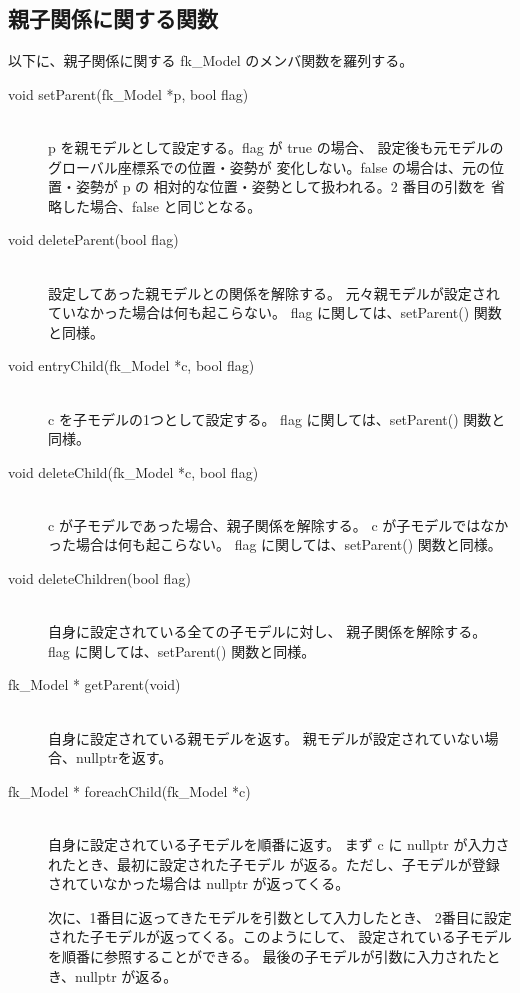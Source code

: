 \subsection{親子関係に関する関数} 
以下に、親子関係に関する fk\_Model のメンバ関数を羅列する。

\begin{description}
\item[void setParent(fk\_Model *p, bool flag)] ~ \\
		p を親モデルとして設定する。flag が true の場合、
		設定後も元モデルのグローバル座標系での位置・姿勢が
		変化しない。false の場合は、元の位置・姿勢が p の
		相対的な位置・姿勢として扱われる。2 番目の引数を
		省略した場合、false と同じとなる。\\

\item[void deleteParent(bool flag)] ~ \\
		設定してあった親モデルとの関係を解除する。
		元々親モデルが設定されていなかった場合は何も起こらない。
		flag に関しては、setParent() 関数と同様。\\

\item[void entryChild(fk\_Model *c, bool flag)] ~ \\
		c を子モデルの1つとして設定する。
		flag に関しては、setParent() 関数と同様。\\

\item[void deleteChild(fk\_Model *c, bool flag)] ~ \\
		c が子モデルであった場合、親子関係を解除する。
		c が子モデルではなかった場合は何も起こらない。
		flag に関しては、setParent() 関数と同様。\\

\item[void deleteChildren(bool flag)] ~ \\
		自身に設定されている全ての子モデルに対し、
		親子関係を解除する。
		flag に関しては、setParent() 関数と同様。\\

\item[fk\_Model * getParent(void)] ~ \\
		自身に設定されている親モデルを返す。
		親モデルが設定されていない場合、nullptrを返す。\\

\item[fk\_Model * foreachChild(fk\_Model *c)] ~ \\
		自身に設定されている子モデルを順番に返す。
		まず c に nullptr が入力されたとき、最初に設定された子モデル
		が返る。ただし、子モデルが登録されていなかった場合は
		nullptr が返ってくる。

		次に、1番目に返ってきたモデルを引数として入力したとき、
		2番目に設定された子モデルが返ってくる。このようにして、
		設定されている子モデルを順番に参照することができる。
		最後の子モデルが引数に入力されたとき、nullptr が返る。
\end{description}

